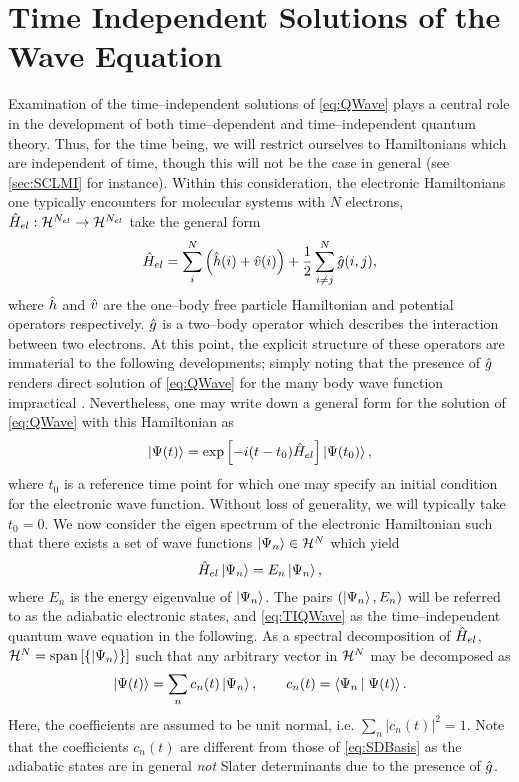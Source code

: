 \section{Time Independent Solutions of the Wave Equation}
\label{sec:MF}

Examination of the time--independent solutions of \cref{eq:QWave} plays a central role in the development
of both time--dependent and time--independent quantum theory. Thus, for the time being, we will restrict
ourselves to Hamiltonians which are independent of time, though this will not be the case in general
(see \cref{sec:SCLMI} for instance).
Within this consideration, the electronic Hamiltonians one typically encounters for molecular systems with $N$ electrons,
$\hat{H}_{el} : \mathcal{H}^{N_{el}} \rightarrow \mathcal{H}^{N_{el}}$ take the general form
\begin{equation}
\label{eq:GenElHam}
\hat{H}_{el} = \sum_{i}^{N} \left( \hat{h}(i) + \hat{v}(i) \right) + \frac{1}{2}\sum_{i \neq j}^{N} \hat{g}(i,j),
\end{equation}
where $\hat{h}$ and $\hat{v}$ are the one--body free particle Hamiltonian and potential operators respectively.
$\hat{g}$ is a two--body operator which describes the interaction between two electrons.
At this point, the explicit structure of these operators are immaterial to the following developments; simply
noting that the presence of $\hat{g}$ renders direct solution of \cref{eq:QWave} for the many body
wave function impractical . Nevertheless, one may write down a general form for the solution
of \cref{eq:QWave} with this Hamiltonian as 
\begin{equation}
\left\vert \Psi (t) \right\rangle = \exp \left[ -i(t - t_0) \hat{H}_{el} \right] \left\vert \Psi (t_0)  \right\rangle,
\end{equation}
where $t_0$ is a reference time point for which one may specify an initial condition for the electronic 
wave function. Without loss of generality, we will typically take $t_0 = 0$. We now consider the eigen
spectrum of the electronic Hamiltonian such that there exists a set of wave functions $\left\vert \Psi_n \right\rangle \in \mathcal{H}^N$
which yield
\begin{equation}
\label{eq:TIQWave}
\hat{H}_{el} \left\vert \Psi_n \right\rangle = E_n \left\vert \Psi_n \right\rangle,
\end{equation}
where $E_n$ is the energy eigenvalue of $\left\vert \Psi_n \right\rangle$. The pairs $(\left\vert \Psi_n \right\rangle,E_n)$ will be referred to
as the adiabatic electronic states, and  \cref{eq:TIQWave} as the time--independent quantum wave equation 
in the following. As a spectral decomposition of $\hat{H}_{el}$, $\mathcal{H}^{N} = \mathrm{span}\left[ \left \lbrace \left\vert \Psi_n \right\rangle \right\rbrace \right]$
such that any arbitrary vector in $\mathcal{H}^{N}$ may be decomposed as
\begin{equation}
\left\vert \Psi (t)  \right\rangle = \sum_n c_n(t) \left\vert \Psi_n \right\rangle,\qquad c_n(t) = \left\langle \Psi_n \left\vert\right. \Psi(t) \right\rangle.
\end{equation}
Here, the coefficients are assumed to be unit normal, i.e. $\sum_n\vert c_n (t) \vert^2 = 1$. 
Note that the coefficients $c_n(t)$ are different from those of \cref{eq:SDBasis} as the
adiabatic states are in general \emph{not} Slater determinants due to the presence of $\hat{g}$.


